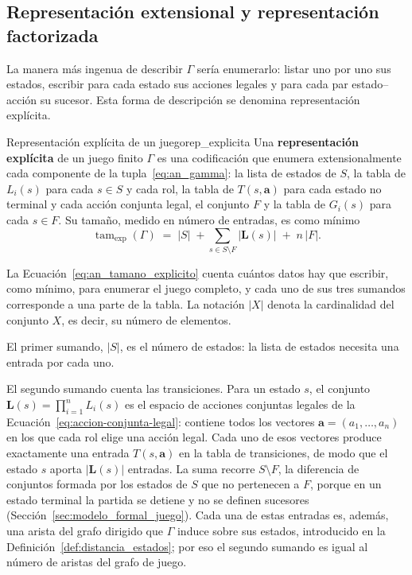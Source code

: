 \subsection{Representación extensional y representación factorizada}

La manera más ingenua de describir $\Gamma$ sería enumerarlo: listar uno por uno sus estados, escribir para cada estado sus acciones legales y para cada par estado--acción su sucesor. Esta forma de descripción se denomina representación explícita.

\begin{definicion}{Representación explícita de un juego}{rep_explicita}
Una \textbf{representación explícita} de un juego finito $\Gamma$ es una codificación que enumera extensionalmente cada componente de la tupla~\eqref{eq:an_gamma}: la lista de estados de $S$, la tabla de $L_i(s)$ para cada $s \in S$ y cada rol, la tabla de $T(s,\mathbf a)$ para cada estado no terminal y cada acción conjunta legal, el conjunto $F$ y la tabla de $G_i(s)$ para cada $s \in F$. Su tamaño, medido en número de entradas, es como mínimo
\begin{equation}
    \operatorname{tam}_{\mathrm{exp}}(\Gamma) \;=\; |S| \;+ \sum_{s \in S \setminus F} |\mathbf L(s)| \;+\; n\,|F| .
    \label{eq:an_tamano_explicito}
\end{equation}
\end{definicion}

La Ecuación~\eqref{eq:an_tamano_explicito} cuenta cuántos datos hay que escribir, como mínimo, para enumerar el juego completo, y cada uno de sus tres sumandos corresponde a una parte de la tabla. La notación $|X|$ denota la cardinalidad del conjunto $X$, es decir, su número de elementos.

El primer sumando, $|S|$, es el número de estados: la lista de estados necesita una entrada por cada uno.

El segundo sumando cuenta las transiciones. Para un estado $s$, el conjunto $\mathbf L(s) = \prod_{i=1}^n L_i(s)$ es el espacio de acciones conjuntas legales de la Ecuación~\eqref{eq:accion-conjunta-legal}: contiene todos los vectores $\mathbf a = (a_1, \dots, a_n)$ en los que cada rol elige una acción legal. Cada uno de esos vectores produce exactamente una entrada $T(s, \mathbf a)$ en la tabla de transiciones, de modo que el estado $s$ aporta $|\mathbf L(s)|$ entradas. La suma recorre $S \setminus F$, la diferencia de conjuntos formada por los estados de $S$ que no pertenecen a $F$, porque en un estado terminal la partida se detiene y no se definen sucesores (Sección~\ref{sec:modelo_formal_juego}). Cada una de estas entradas es, además, una arista del grafo dirigido que $\Gamma$ induce sobre sus estados, introducido en la Definición~\ref{def:distancia_estados}; por eso el segundo sumando es igual al número de aristas del grafo de juego.


